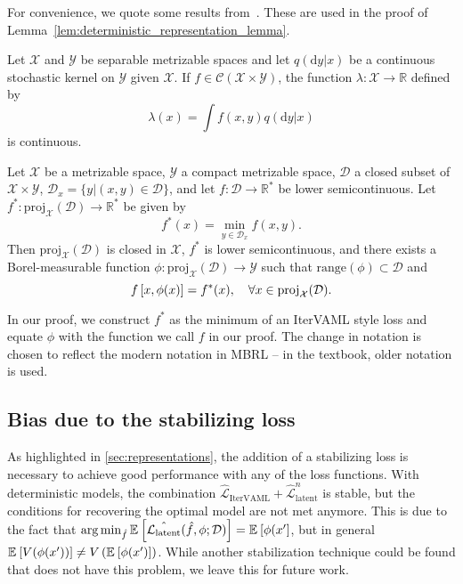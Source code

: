 For convenience, we quote some results from~\cite{BertsekasShreve1978}. These are used in the proof of Lemma~\ref{lem:deterministic_representation_lemma}.

\begin{proposition}
\label{prop:730}
    Let $\mathcal{X}$ and $\mathcal{Y}$ be separable metrizable spaces and let $q(\mathrm{d}y|x)$ be a continuous stochastic kernel on $\mathcal{Y}$ given $\mathcal{X}$. If $f\in\mathcal{C}(\mathcal{X}\times \mathcal{Y})$, the function $\lambda: \mathcal{X} \rightarrow \mathbb{R}$ defined by
    \[
        \lambda(x) = \int f(x,y) q(\mathrm{d}y|x)
    \]
    is continuous.
\end{proposition}

\newcommand{\proj}{\text{proj}}
\begin{proposition}
\label{prop:733}
    Let $\mathcal{X}$ be a metrizable space, $\mathcal{Y}$ a compact metrizable space, $\mathcal{D}$ a closed subset of $\mathcal{X}\times\mathcal{Y}$, $\mathcal{D}_x = \{y | (x,y) \in \mathcal{D} \}$, and let $f:\mathcal{D}\rightarrow \mathbb{R}^*$ be lower semicontinuous.
    Let $f^*:\proj_\mathcal{X}(\mathcal{D}) \rightarrow \mathbb{R}^*$ be given by \[
    f^*(x) = \min_{y \in \mathcal{D}_x} f(x,y).
    \]
    Then $\proj_\mathcal{X}(\mathcal{D})$ is closed in $\mathcal{X}$, $f^*$ is lower semicontinuous, and there exists a Borel-measurable function $\phi: \proj_\mathcal{X}(\mathcal{D}) \rightarrow \mathcal{Y}$ such that $\text{range}(\phi) \subset \mathcal{D}$ and \[
    f\squareb{x, \phi(x)} = f^*(x), \quad \forall x \in \proj_\mathcal{X}(\mathcal{D}).
    \]
\end{proposition}

In our proof, we construct $f^*$ as the minimum of an IterVAML style loss and equate $\phi$ with the function we call $f$ in our proof.
The change in notation is chosen to reflect the modern notation in MBRL -- in the textbook, older notation is used.

\subsection{Bias due to the stabilizing loss}
\label{app:bias_latent_model}

As highlighted in \autoref{sec:representations}, the addition of a stabilizing loss is necessary to achieve good performance with any of the loss functions.
With deterministic models, the combination $\hat{\mathcal{L}}_\text{IterVAML} + \hat{\mathcal{L}}^n_\text{latent}$ is stable, but the conditions for recovering the optimal model are not met anymore.
This is due to the fact that $\operatorname*{arg\,min}_{\hat{f}} \mathbb{E}_{}\left[  \hat{\mathcal{L}_\text{latent}}(\hat{f},\phi; \mathcal{D}) \right] = \mathbb{E}_{}\left[  \phi(x' \right]$, but in general $\mathbb{E}_{}\left[  V(\phi(x')) \right] \neq V\left( \mathbb{E}_{}\left[  \phi(x') \right] \right)$.
While another stabilization technique could be found that does not have this problem, we leave this for future work.


